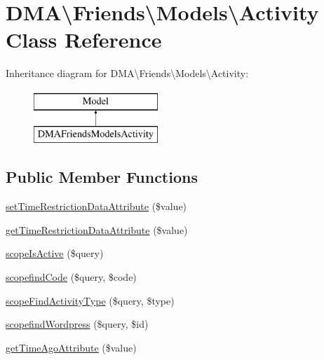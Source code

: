 \hypertarget{classDMA_1_1Friends_1_1Models_1_1Activity}{\section{D\-M\-A\textbackslash{}Friends\textbackslash{}Models\textbackslash{}Activity Class Reference}
\label{classDMA_1_1Friends_1_1Models_1_1Activity}
}
Inheritance diagram for D\-M\-A\textbackslash{}Friends\textbackslash{}Models\textbackslash{}Activity\-:\begin{figure}[H]
\begin{center}
\leavevmode
\includegraphics[height=2.000000cm]{dc/d8c/classDMA_1_1Friends_1_1Models_1_1Activity}
\end{center}
\end{figure}
\subsection*{Public Member Functions}
\begin{DoxyCompactItemize}
\item 
\hyperlink{classDMA_1_1Friends_1_1Models_1_1Activity_ade0ffca24448c217def365d104e52866}{set\-Time\-Restriction\-Data\-Attribute} (\$value)
\item 
\hyperlink{classDMA_1_1Friends_1_1Models_1_1Activity_a98a904c739aca30f2a26152a481164b6}{get\-Time\-Restriction\-Data\-Attribute} (\$value)
\item 
\hyperlink{classDMA_1_1Friends_1_1Models_1_1Activity_acd3f12824d95be07b5221cdc9d64abf7}{scope\-Is\-Active} (\$query)
\item 
\hyperlink{classDMA_1_1Friends_1_1Models_1_1Activity_a9bb36aab36ff22a29b2a594617dd591c}{scopefind\-Code} (\$query, \$code)
\item 
\hyperlink{classDMA_1_1Friends_1_1Models_1_1Activity_aa17825817b73d3073e37d5e2c0933003}{scope\-Find\-Activity\-Type} (\$query, \$type)
\item 
\hyperlink{classDMA_1_1Friends_1_1Models_1_1Activity_a5a533a3f638f99d1dd0a8e0550def49e}{scopefind\-Wordpress} (\$query, \$id)
\item 
\hyperlink{classDMA_1_1Friends_1_1Models_1_1Activity_a03415578b3f688ecd26d27d9254d23ab}{get\-Time\-Ago\-Attribute} (\$value)
\end{DoxyCompactItemize}
